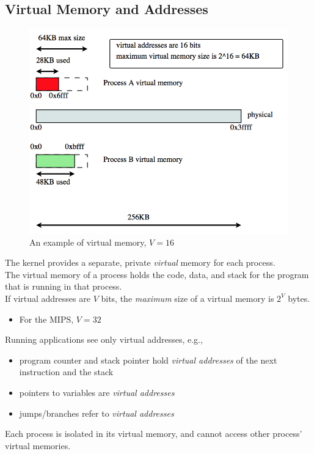 \documentclass[12pt]{article}
\theoremstyle{plain}
\theoremstyle{definition}
\begin{document}
\subsection{Virtual Memory and Addresses}
\begin{figure}[H]
  \centering
  \includegraphics[scale=0.65]{pictures/v_mem.png}
  \caption{An example of virtual memory, $V = 16$}
  \label{fig:v_mem}
\end{figure}
The kernel provides a separate, private \emph{virtual} memory for each process. \\
The virtual memory of a process holds the code, data, and stack for the program that is running in that process. \\
If virtual addresses are $V$ bits, the \emph{maximum} size of a virtual memory is $2^{V}$ bytes.
\begin{itemize}
  \item For the MIPS, $V = 32$
\end{itemize}
Running applications see only virtual addresses, e.g.,
\begin{itemize}
  \item program counter and stack pointer hold \emph{virtual addresses} of the next instruction and the stack
  \item pointers to variables are \emph{virtual addresses}
  \item jumps/branches refer to \emph{virtual addresses}
\end{itemize}
Each process is isolated in its virtual memory, and cannot access other process' virtual memories.
\end{document}
